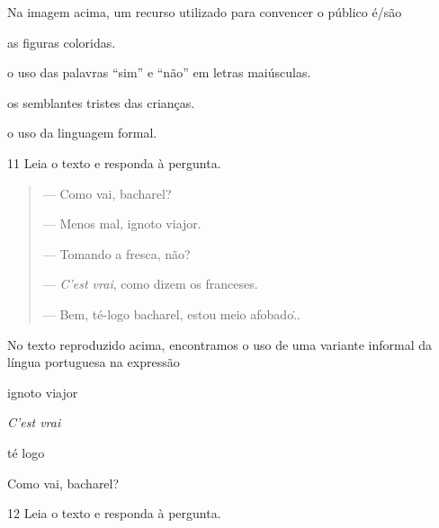 
Na imagem acima, um recurso utilizado para convencer o público é/são

\begin{escolha}
  \item as figuras coloridas.

  \item o uso das palavras ``sim'' e ``não'' em letras maiúsculas.

  \item os semblantes tristes das crianças.

  \item o uso da linguagem formal.
\end{escolha}


\num{11} Leia o texto e responda à pergunta.

\begin{quote}
--- Como vai, bacharel?

--- Menos mal, ignoto viajor.

--- Tomando a fresca, não?

--- \textit{C'est vrai}, como dizem os franceses.

--- Bem, té-logo bacharel, estou meio afobado\...
\end{quote}


No texto reproduzido acima, encontramos o uso de uma variante informal
da língua portuguesa na expressão

\begin{escolha}
  \item ignoto viajor 

  \item \textit{C'est vrai}

  \item té logo

  \item Como vai, bacharel?
\end{escolha}

\num{12} Leia o texto e responda à pergunta.

